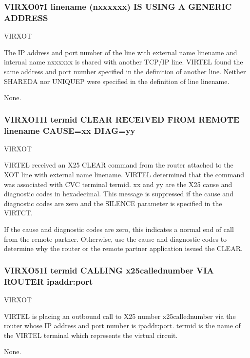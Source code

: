 \documentclass[letterpaper,10pt,english]{sphinxmanual}
\begin{document}
\subsubsection{VIRXO07I linename (n\sphinxhyphen{}xxxxxx) IS USING A GENERIC ADDRESS}
\label{\detokenize{messages:virxo07i-linename-n-xxxxxx-is-using-a-generic-address}}\begin{description}
\sphinxAtStartPar
VIRXOT

\sphinxAtStartPar
The IP address and port number of the line with external name linename and internal name n\sphinxhyphen{}xxxxxx is shared with another TCP/IP line. VIRTEL found the same address and port number specified in the definition of another line. Neither SHAREDA nor UNIQUEP were specified in the definition of line linename.

\sphinxAtStartPar
None.

\end{description}


\subsubsection{VIRXO11I termid CLEAR RECEIVED FROM REMOTE linename CAUSE=xx DIAG=yy}
\label{\detokenize{messages:virxo11i-termid-clear-received-from-remote-linename-cause-xx-diag-yy}}\begin{description}
\sphinxAtStartPar
VIRXOT

\sphinxAtStartPar
VIRTEL received an X25 CLEAR command from the router attached to the XOT line with external name linename. VIRTEL determined that the command was associated with CVC terminal termid. xx and yy are the X25 cause and diagnostic codes in hexadecimal. This message is suppressed if the cause and diagnostic codes are zero and the SILENCE parameter is specified in the VIRTCT.

\sphinxAtStartPar
If the cause and diagnostic codes are zero, this indicates a normal end of call from the remote partner. Otherwise, use the cause and diagnostic codes to determine why the router or the remote partner application issued the CLEAR.

\end{description}


\subsubsection{VIRXO51I termid CALLING x25callednumber VIA ROUTER ipaddr:port}
\label{\detokenize{messages:virxo51i-termid-calling-x25callednumber-via-router-ipaddr-port}}\begin{description}
\sphinxAtStartPar
VIRXOT

\sphinxAtStartPar
VIRTEL is placing an outbound call to X25 number x25callednumber via the router whose IP address and port number is ipaddr:port. termid is the name of the VIRTEL terminal which represents the virtual circuit.

\sphinxAtStartPar
None.

\end{description}
\end{document}
